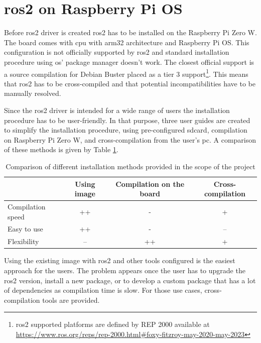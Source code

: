 \section{\ac{ros2} on Raspberry Pi OS}
Before \ac{ros2} driver is created \ac{ros2} has to be installed on the Raspberry Pi Zero W.
The board comes with \ac{cpu} with arm32 architecture and Raspberry Pi OS.
This configuration is not officially supported by \ac{ros2} and standard installation procedure using \acs{os}' package manager doesn't work.
The closest official support is a source compilation for Debian Buster placed as a tier 3 support\footnote{\ac{ros2} supported platforms are defined by REP 2000 available at \url{https://www.ros.org/reps/rep-2000.html\#foxy-fitzroy-may-2020-may-2023}}.
This means that \ac{ros2} has to be cross-compiled and that potential incompatibilities have to be manually resolved.

Since the \ac{ros2} driver is intended for a wide range of users the installation procedure has to be user-friendly.
In that purpose, three user guides are created to simplify the installation procedure, using pre-configured \ac{sdcard}, compilation on Raspberry Pi Zero W, and cross-compilation from the user's \ac{pc}.
A comparison of these methods is given by Table \ref{tab:physical:installation}.

\begin{table}[H]
    \begin{adjustwidth}{-1.5in}{-1.5in}
    \centering
    \begin{tabular}{|l|c|c|c|}
        \hline
        & \textbf{Using image} & \textbf{Compilation on the board} & \textbf{Cross-compilation} \\
        \hline
        Compilation speed & ++ & - & + \\
        \hline
        Easy to use & ++ & - & -- \\
        \hline
        Flexibility & -- & ++ & + \\
        \hline
    \end{tabular}
    \caption{Comparison of different installation methods provided in the scope of the project}
    \label{tab:physical:installation}
    \end{adjustwidth}
\end{table}

Using the existing image with \ac{ros2} and other tools configured is the easiest approach for the users.
The problem appears once the user has to upgrade the \ac{ros2} version, install a new package, or to develop a custom package that has a lot of dependencies as compilation time is slow.
For those use cases, cross-compilation tools are provided.


